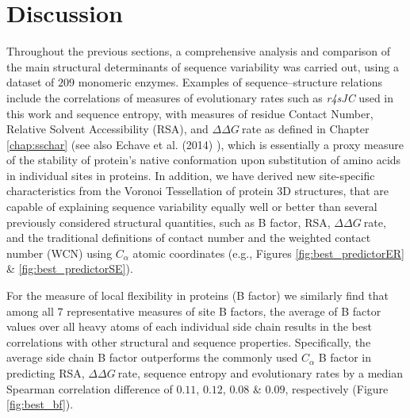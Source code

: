 \documentclass[11pt]{article}
\newcommand{\ddg}{$\Delta\Delta G~$}
\begin{document}
\section{Discussion}
\label{sec:discussion}

    Throughout the previous sections,  a comprehensive analysis and comparison of the main structural determinants of sequence variability was carried out, using a dataset of $209$ monomeric enzymes. Examples of sequence--structure relations include the correlations of measures of evolutionary rates such as {\it r4sJC} used in this work and sequence entropy, with measures of residue Contact Number, Relative Solvent Accessibility (RSA), and \ddg rate as defined in Chapter \ref{chap:sschar} (see also Echave et al. (2014) \cite{echave_relationship_2014}), which is essentially a proxy measure of the stability of protein's native conformation upon substitution of amino acids in individual sites in proteins. In addition, we have derived new site-specific characteristics from the Voronoi Tessellation of protein 3D structures, that are capable of explaining sequence variability equally well or better than several previously considered structural quantities, such as B factor, RSA, \ddg rate, and the traditional definitions of contact number and the weighted contact number (WCN) using $C_\alpha$ atomic coordinates (e.g., Figures \ref{fig:best_predictorER} \& \ref{fig:best_predictorSE}).


    For the measure of local flexibility in proteins (B factor) we similarly find that among all $7$ representative measures of site B factors, the average of B factor values over all heavy atoms of each individual side chain results in the best correlations with other structural and sequence properties. Specifically, the average side chain B factor outperforms the commonly used $C_\alpha$ B factor in predicting RSA, \ddg rate, sequence entropy and evolutionary rates by a median Spearman correlation difference of $0.11$, $0.12$, $0.08$ \& $0.09$, respectively (Figure \ref{fig:best_bf}). \\

\end{document}
